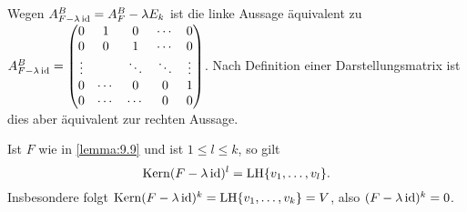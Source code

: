 \begin{beweis}
	Wegen $A_{F - \lambda \operatorname{id}}^B = A_F^B - \lambda E_k$ ist die linke Aussage äquivalent zu $A_{F - \lambda \operatorname{id}}^B = \begin{pmatrix}
		0 & 1 & 0 & \cdots & 0 \\ 
		0 & 0 & 1 & \cdots & 0 \\ 
		\vdots &  & \ddots & \ddots & \vdots \\ 
		0 & \cdots & 0 & 0 & 1 \\ 
		0 & \cdots & \cdots & 0 & 0
		\end{pmatrix}$.
	Nach Definition einer Darstellungsmatrix ist dies aber äquivalent zur rechten Aussage.  \qedhere
\end{beweis}

\begin{bemerkung}
	\label{bem:9.10}
	Ist $F$ wie in \autoref{lemma:9.9} und ist $1 \leq l \leq k$, so gilt
	\[
		\operatorname{Kern}(F-\lambda \operatorname{id})^l = \operatorname{LH}\{v_1,\dots,v_l\}.
	\]
	Insbesondere folgt $\operatorname{Kern}(F- \lambda \operatorname{id})^k = \operatorname{LH}\{v_1,\dots,v_k\} = V$, also $(F-\lambda \operatorname{id})^k = 0$.
	

\end{bemerkung}
